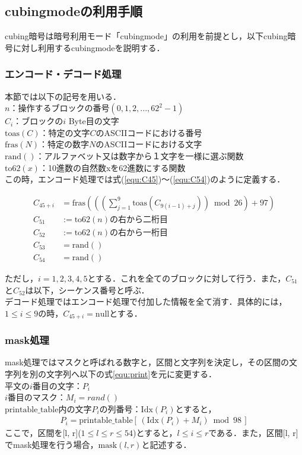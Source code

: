 \documentclass[a4j,titlepage]{jsarticle}
\begin{document}
\subsection{cubingmodeの利用手順}
cubing暗号は暗号利用モード「cubingmode」の利用を前提とし，以下cubing暗号に対し利用するcubingmodeを説明する．

\subsubsection{エンコード・デコード処理}
本節では以下の記号を用いる．\\
\noindent
\(n\)：操作するブロックの番号\((0,1,2,...,62^2-1)\)\\
\(C_i\)：ブロックの\(i\) Byte目の文字\\
\(\mathrm{toas}(C)\)：特定の文字\(C\)のASCIIコードにおける番号\\
\(\mathrm{fras}(N)\)：特定の数字\(N\)のASCIIコードにおける文字\\
\(\mathrm{rand}()\)：アルファベット又は数字から１文字を一様に選ぶ関数\\
\(\mathrm{to62}(x)\)：10進数の自然数xを62進数にする関数\\
この時，エンコード処理では式(\ref{equ:C45})〜(\ref{equ:C54})のように定義する．

\begin{align}
  C_{45 + i} &= \mathrm{fras} \left( \left( \left( \sum_{j = 1}^9 \mathrm{toas}(C_{9 \left( i - 1 \right) + j} )\right)\bmod 26 \right) + 97 \right) \label{equ:C45}\\
  C_{51} &:= \mathrm{to62}(n)の右から二桁目 \\
  C_{52} &:= \mathrm{to62}(n)の右から一桁目 \\
  C_{53} &= \mathrm{rand}() \\
  C_{54} &= \mathrm{rand}() \label{equ:C54}
\end{align}

ただし，\(i=1,2,3,4,5\)とする．これを全てのブロックに対して行う．また，\(C_{51}\)と\(C_{52}\)は以下，シーケンス番号と呼ぶ．\\
デコード処理ではエンコード処理で付加した情報を全て消す．具体的には，\(1 \leq i \leq 9\)の時，\(C_{45+i}=\mathrm{null}\)とする．

\subsubsection{mask処理}
mask処理ではマスクと呼ばれる数字と，区間と文字列を決定し，その区間の文字列を別の文字列へ以下の式\ref{equ:print}を元に変更する．\\
平文の\(i\)番目の文字：\(P_i\)\\
\(i\)番目のマスク：\(M_i = rand()\)\\
\(\mathrm{printable\_table}\)内の文字\(P_i\)の列番号：\(\mathrm{Idx}(P_i)\)とすると，
\begin{align}
  P_i=\mathrm{printable\_table}[\,(\mathrm{Idx}(P_i)+M_i) \bmod 98\,]\label{equ:print}
\end{align}
ここで，区間を[l, r](\(1 \leq l \leq r \leq 54\))とすると，\(l\leq i \leq r\)である．また，区間[l, r]でmask処理を行う場合，\(\mathrm{mask}(l, r)\)と記述する．
\end{document}
